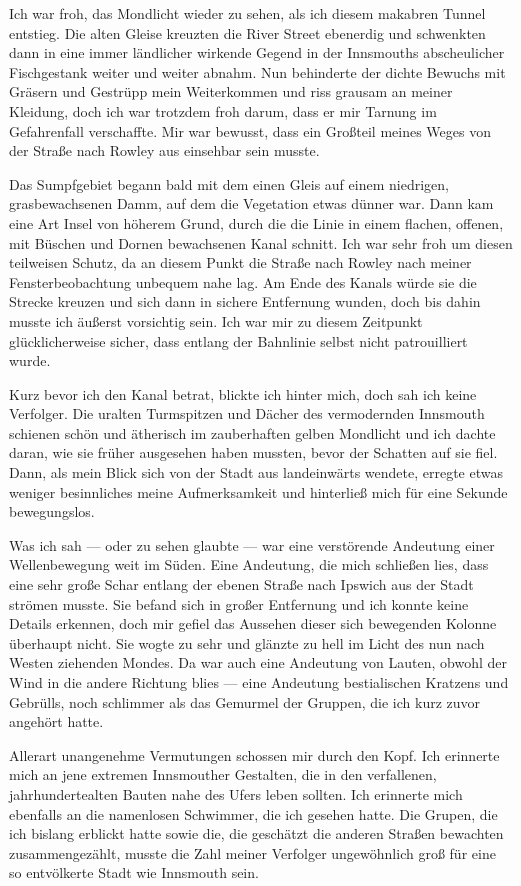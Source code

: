 Ich war froh, das Mondlicht wieder zu sehen, als ich diesem makabren Tunnel entstieg. Die alten Gleise kreuzten die River Street ebenerdig und schwenkten dann in eine immer ländlicher wirkende Gegend in der Innsmouths abscheulicher Fischgestank weiter und weiter abnahm. Nun behinderte der dichte Bewuchs mit Gräsern und Gestrüpp mein Weiterkommen und riss grausam an meiner Kleidung, doch ich war trotzdem froh darum, dass er mir Tarnung im Gefahrenfall verschaffte. Mir war bewusst, dass ein Großteil meines Weges von der Straße nach Rowley aus einsehbar sein musste.

Das Sumpfgebiet begann bald mit dem einen Gleis auf einem niedrigen, grasbewachsenen Damm, auf dem die Vegetation etwas dünner war. Dann kam eine Art Insel von höherem Grund, durch die die Linie in einem flachen, offenen, mit Büschen und Dornen bewachsenen Kanal schnitt. Ich war sehr froh um diesen teilweisen Schutz, da an diesem Punkt die Straße nach Rowley nach meiner Fensterbeobachtung unbequem nahe lag. Am Ende des Kanals würde sie die Strecke kreuzen und sich dann in sichere Entfernung wunden, doch bis dahin musste ich äußerst vorsichtig sein. Ich war mir zu diesem Zeitpunkt glücklicherweise sicher, dass entlang der Bahnlinie selbst nicht patrouilliert wurde.

Kurz bevor ich den Kanal betrat, blickte ich hinter mich, doch sah ich keine Verfolger. Die uralten Turmspitzen und Dächer des vermodernden Innsmouth schienen schön und ätherisch im zauberhaften gelben Mondlicht und ich dachte daran, wie sie früher ausgesehen haben mussten, bevor der Schatten auf sie fiel. Dann, als mein Blick sich von der Stadt aus landeinwärts wendete, erregte etwas weniger besinnliches meine Aufmerksamkeit und hinterließ mich für eine Sekunde bewegungslos.

Was ich sah --- oder zu sehen glaubte --- war eine verstörende Andeutung einer Wellenbewegung weit im Süden. Eine Andeutung, die mich schließen lies, dass eine sehr große Schar entlang der ebenen Straße nach Ipswich aus der Stadt strömen musste. Sie befand sich in großer Entfernung und ich konnte keine Details erkennen, doch mir gefiel das Aussehen dieser sich bewegenden Kolonne überhaupt nicht. Sie wogte zu sehr und glänzte zu hell im Licht des nun nach Westen ziehenden Mondes. Da war auch eine Andeutung von Lauten, obwohl der Wind in die andere Richtung blies --- eine Andeutung bestialischen Kratzens und Gebrülls, noch schlimmer als das Gemurmel der Gruppen, die ich kurz zuvor angehört hatte.

Allerart unangenehme Vermutungen schossen mir durch den Kopf. Ich erinnerte mich an jene extremen Innsmouther Gestalten, die in den verfallenen, jahrhundertealten Bauten nahe des Ufers leben sollten. Ich erinnerte mich ebenfalls an die namenlosen Schwimmer, die ich gesehen hatte. Die Grupen, die ich bislang erblickt hatte sowie die, die geschätzt die anderen Straßen bewachten zusammengezählt, musste die Zahl meiner Verfolger ungewöhnlich groß für eine so entvölkerte Stadt wie Innsmouth sein.

